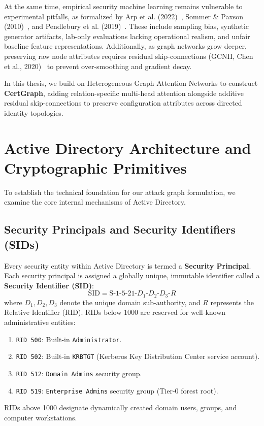 At the same time, empirical security machine learning remains vulnerable to experimental pitfalls, as formalized by Arp et al. (2022)~\cite{arp2022dos}, Sommer \& Paxson (2010)~\cite{sommer2010outside}, and Pendlebury et al. (2019)~\cite{pendlebury2019tesseract}. These include sampling bias, synthetic generator artifacts, lab-only evaluations lacking operational realism, and unfair baseline feature representations. Additionally, as graph networks grow deeper, preserving raw node attributes requires residual skip-connections (GCNII, Chen et al., 2020)~\cite{chen2020simple} to prevent over-smoothing and gradient decay.

In this thesis, we build on Heterogeneous Graph Attention Networks to construct \textbf{CertGraph}, adding relation-specific multi-head attention alongside additive residual skip-connections to preserve configuration attributes across directed identity topologies.

\section{Active Directory Architecture and Cryptographic Primitives}
To establish the technical foundation for our attack graph formulation, we examine the core internal mechanisms of Active Directory.

\subsection{Security Principals and Security Identifiers (SIDs)}
Every security entity within Active Directory is termed a \textbf{Security Principal}. Each security principal is assigned a globally unique, immutable identifier called a \textbf{Security Identifier (SID)}:
\begin{equation}
\text{SID} = \text{S-}1\text{-}5\text{-}21\text{-}D_1\text{-}D_2\text{-}D_3\text{-}R
\end{equation}
where $D_1, D_2, D_3$ denote the unique domain sub-authority, and $R$ represents the Relative Identifier (RID). RIDs below 1000 are reserved for well-known administrative entities:
\begin{enumerate}
    \item \texttt{RID 500}: Built-in \texttt{Administrator}.
    \item \texttt{RID 502}: Built-in \texttt{KRBTGT} (Kerberos Key Distribution Center service account).
    \item \texttt{RID 512}: \texttt{Domain Admins} security group.
    \item \texttt{RID 519}: \texttt{Enterprise Admins} security group (Tier-0 forest root).
\end{enumerate}
RIDs above 1000 designate dynamically created domain users, groups, and computer workstations.

